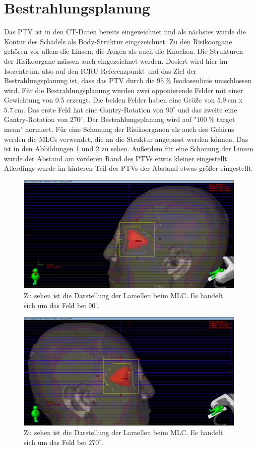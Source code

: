 \section{Bestrahlungsplanung}
\label{sec:Bestrahlungsplanung}
Das PTV ist in den CT-Daten bereits eingezeichnet und als nächstes wurde die Kontur des Schädels als Body-Struktur eingezeichnet. Zu den Risikoorgane gehören vor allem die Linsen, die Augen als auch die Knochen. Die Strukturen der Risikoorgane müssen auch eingezeichnet werden. Dosiert wird hier im Isozentrum, also auf den ICRU Referenzpunkt und das Ziel der Bestrahlungsplanung ist, dass das PTV durch die $\SI{95}{\percent}$ Isodosenlinie umschlossen wird. Für die Bestrahlungsplanung wurden zwei opponierende Felder mit einer Gewichtung von 0.5 erzeugt. Die beiden Felder haben eine Größe von $\SI{5,9}{\centi\meter}$ x $\SI{5,7}{\centi\meter}$. Das erste Feld hat eine Gantry-Rotation von $90^\circ$ und das zweite eine Gantry-Rotation von $270^\circ$. Der Bestrahlungsplanung wird auf "$\SI{100}{\percent}$ target mean" normiert. Für eine Schonung der Risikoorganen als auch des Gehirns werden die MLCs verwendet, die an die Struktur angepasst werden können. Das ist in den Abbildungen \ref{fig:mlcfeld1} und \ref{fig:mlcfeld2} zu sehen. Außerdem für eine Schonung der Linsen wurde der Abstand am vorderen Rand des PTVs etwas kleiner eingestellt. Allerdings wurde im hinteren Teil des PTVs der Abstand etwas größer eingestellt.

\begin{figure}[htpb]
	\centering
	\includegraphics[width=0.7\linewidth]{../Bilder/MLC_Feld1}
	\caption{Zu sehen ist die Darstellung der Lamellen beim MLC. Es handelt sich um das Feld bei $90^\circ$.}
	\label{fig:mlcfeld1}
\end{figure}

\begin{figure}[htpb]
	\centering
	\includegraphics[width=0.7\linewidth]{../Bilder/MLC_Feld2}
	\caption{Zu sehen ist die Darstellung der Lamellen beim MLC. Es handelt sich um das Feld bei $270^\circ$.}
	\label{fig:mlcfeld2}
\end{figure}


